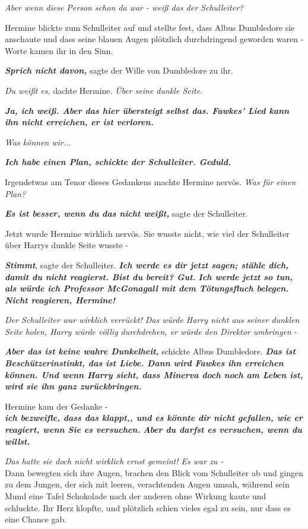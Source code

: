 {\emph{Aber wenn diese Person schon da war - weiß das der Schulleiter?}

Hermine blickte zum Schulleiter auf und stellte fest, dass Albus Dumbledore sie anschaute und dass seine blauen Augen plötzlich durchdringend geworden waren - Worte kamen ihr in den Sinn.

\textbf{\emph{Sprich nicht davon,}} sagte der Wille von Dumbledore zu ihr.

\emph{Du weißt es,} dachte Hermine. \emph{Über seine dunkle Seite.}

\textbf{\emph{Ja, ich weiß. Aber das hier übersteigt selbst das. Fawkes' Lied kann ihn nicht erreichen, er ist verloren.}}

\emph{Was können wir...}

\textbf{\emph{Ich habe einen Plan, schickte der Schulleiter. Geduld.}}

Irgendetwas am Tenor dieses Gedankens machte Hermine nervös. \emph{Was für einen Plan?}

\textbf{\emph{Es ist besser, wenn du das nicht weißt,}} sagte der Schulleiter.

Jetzt wurde Hermine wirklich nervös. Sie wusste nicht, wie viel der Schulleiter über Harrys dunkle Seite wusste -

\textbf{\emph{Stimmt}}, sagte der Schulleiter. \textbf{\emph{Ich werde es dir jetzt sagen; stähle dich, damit du nicht reagierst. Bist du bereit? Gut.}} \textbf{\emph{Ich werde jetzt so tun, als würde ich Professor McGonagall mit dem Tötungsfluch belegen. Nicht reagieren, Hermine!}}

\emph{Der Schulleiter war wirklich verrückt! Das würde Harry nicht aus seiner dunklen Seite holen, Harry würde völlig durchdrehen, er würde den Direktor umbringen} -

\textbf{\emph{Aber das ist keine wahre Dunkelheit,}} schickte Albus Dumbledore. \textbf{\emph{Das ist Beschützerinstinkt, das ist Liebe. Dann wird Fawkes ihn erreichen können. Und wenn Harry sieht, dass Minerva doch noch am Leben ist, wird sie ihn ganz zurückbringen.}}

Hermine kam der Gedanke -\\ \textbf{\emph{ich bezweifle, dass das klappt,, und es könnte dir nicht gefallen, wie er reagiert, wenn Sie es versuchen.}} \textbf{\emph{Aber du darfst es versuchen, wenn du willst.}}

\emph{Das hatte sie doch nicht wirklich ernst gemeint! Es war zu -}\\ Dann bewegten sich ihre Augen, brachen den Blick vom Schulleiter ab und gingen zu dem Jungen, der sich mit leeren, verachtenden Augen umsah, während sein Mund eine Tafel Schokolade nach der anderen ohne Wirkung kaute und schluckte. Ihr Herz klopfte, und plötzlich schien vieles egal zu sein, nur dass es eine Chance gab.

}
